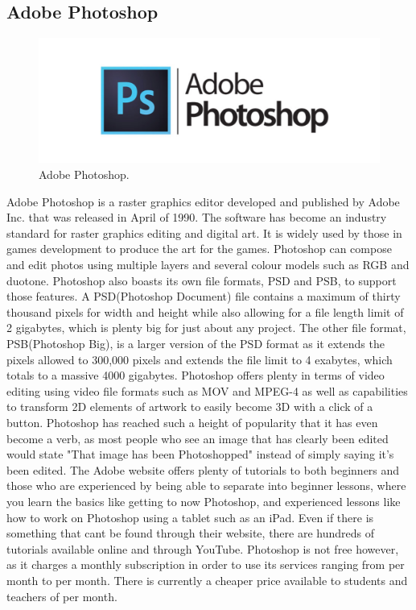 \subsection{Adobe Photoshop}
\begin{figure}[h]
  \includegraphics[width=\linewidth]{Images/adobe-photoshop.jpg}
  \caption{Adobe Photoshop.}
  \label{fig:Photoshop}
\end{figure}
Adobe Photoshop is a raster graphics editor developed and published by Adobe Inc. that was released in April of 1990. The software has become an industry standard for raster graphics editing and digital art. It is widely used by those in games development to produce the art for the games. Photoshop can compose and edit photos using multiple layers and several colour models such as RGB and duotone. Photoshop also boasts its own file formats, PSD and PSB, to support those features. A PSD(Photoshop Document) file contains a maximum of thirty thousand pixels for width and height while also allowing for a file length limit of 2 gigabytes, which is plenty big for just about any project. The other file format, PSB(Photoshop Big), is a larger version of the PSD format as it extends the pixels allowed to 300,000 pixels and extends the file limit to 4 exabytes, which totals to a massive 4000 gigabytes. Photoshop offers plenty in terms of video editing using video file formats such as MOV and MPEG-4 as well as capabilities to transform 2D elements of artwork to easily become 3D with a click of a button. Photoshop has reached such a height of popularity that it has even become a verb, as most people who see an image that has clearly been edited would state "That image has been Photoshopped" instead of simply saying it's been edited.
The Adobe website offers plenty of tutorials to both beginners and those who are experienced by being able to separate into beginner lessons, where you learn the basics like getting to now Photoshop, and experienced lessons like how to work on Photoshop using a tablet such as an iPad. Even if there is something that cant be found through their website, there are hundreds of tutorials available online and through YouTube.
Photoshop is not free however, as it charges a monthly subscription in order to use its services ranging from   per month to   per month. There is currently a cheaper price available to students and teachers of  per month.\cite{AdobePhotoshop}\cite{AboutAdobePhotoshop}

